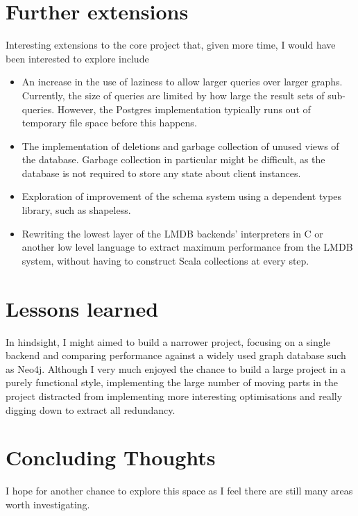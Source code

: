 \documentclass[12pt,a4paper,twoside,openright]{report}
\begin{document}
\section{Further extensions}
Interesting extensions to the core project that, given more time, I would have been interested to explore include
\begin{itemize}
 \item An increase in the use of laziness to allow larger queries over larger graphs. Currently, the size of queries are limited by how large the result sets of sub-queries. However, the Postgres implementation typically runs out of temporary file space before this happens.
 \item The implementation of deletions and garbage collection of unused views of the database. Garbage collection in particular might be difficult, as the database is not required to store any state about client instances.
 \item Exploration of  improvement of the schema system using a dependent types library, such as shapeless.
 \item Rewriting the lowest layer of the LMDB backends' interpreters in C or another low level language to extract maximum performance from the LMDB system, without having to construct Scala collections at every step.
\end{itemize}

\section{Lessons learned}
	In hindsight, I might aimed to build a narrower project, focusing on a single backend and comparing  performance against a widely used graph database such as Neo4j. Although I very much enjoyed the chance to build a large project in a purely functional style, implementing the large number of moving parts in the project distracted from implementing more interesting optimisations and really digging down to extract all redundancy.

\section{Concluding Thoughts}
I hope for another chance to explore this space as I feel there are still many areas worth investigating.





\end{document}

